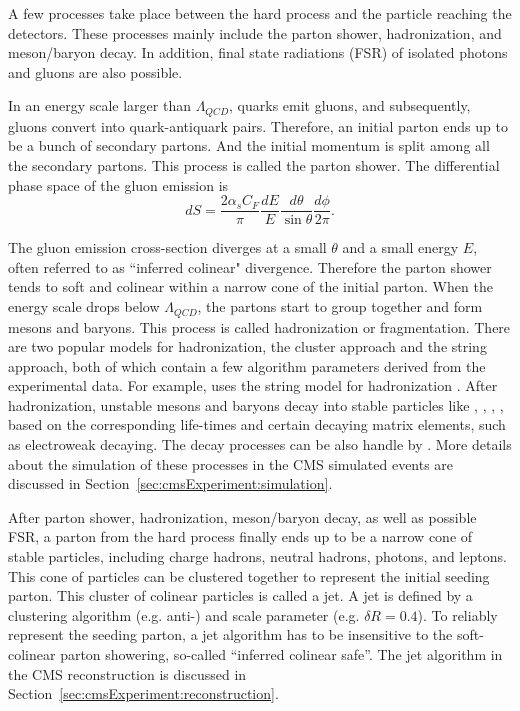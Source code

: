 A few processes take place between the hard process and the particle reaching the detectors. These processes mainly include the parton shower, hadronization, and meson/baryon decay. In addition, final state radiations (FSR) of isolated photons and gluons are also possible.

In an energy scale larger than $\Lambda_{QCD}$, quarks emit gluons, and subsequently, gluons convert into quark-antiquark pairs. Therefore, an initial parton ends up to be a bunch of secondary partons. And the initial momentum is split among all the secondary partons. This process is called the parton shower. The differential phase space of the gluon emission is
\begin{equation}
    dS = \frac{2\alpha_s C_F}{\pi} \frac{dE}{E}\frac{d\theta}{\sin \theta} \frac{d\phi}{2\pi}.
\end{equation}

\noindent The gluon emission cross-section diverges at a small $\theta$ and a small energy $E$, often referred to as ``inferred colinear" divergence. Therefore the parton shower tends to soft and colinear within a narrow cone of the initial parton. 
When the energy scale drops below $\Lambda_{QCD}$, the partons start to group together and form mesons and baryons. This process is called hadronization or fragmentation. There are two popular models for hadronization, the cluster approach and the string approach, both of which contain a few algorithm parameters derived from the experimental data. For example, \PYTHIA uses the string model for hadronization \cite{ANDERSSON198331}. After hadronization, unstable mesons and baryons decay into stable particles like \PGp, \PK, \PGg, \Pe, \PGm based on the corresponding life-times and certain decaying matrix elements, such as electroweak decaying. The decay processes can be also handle by \PYTHIA. More details about the simulation of these processes in the CMS simulated events are discussed in Section~\ref{sec:cmsExperiment:simulation}.

After parton shower, hadronization, meson/baryon decay, as well as possible FSR, a parton from the hard process finally ends up to be a narrow cone of stable particles, including charge hadrons, neutral hadrons, photons, and leptons. This cone of particles can be clustered together to represent the initial seeding parton. This cluster of colinear particles is called a jet. A jet is defined by a clustering algorithm (e.g. anti-\kt) and scale parameter (e.g. $\delta R=0.4$). To reliably represent the seeding parton, a jet algorithm has to be insensitive to the soft-colinear parton showering, so-called ``inferred colinear safe''. The jet algorithm in the CMS reconstruction is discussed in Section~\ref{sec:cmsExperiment:reconstruction}.

